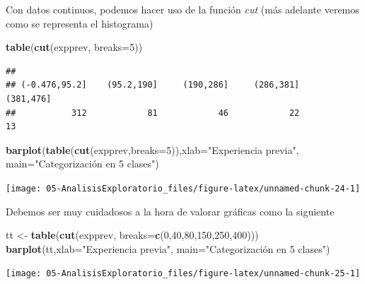 \documentclass[]{book}
\newenvironment{Shaded}{\begin{snugshade}}{\end{snugshade}}
\newcommand{\KeywordTok}[1]{\textcolor[rgb]{0.13,0.29,0.53}{\textbf{#1}}}
\newcommand{\DataTypeTok}[1]{\textcolor[rgb]{0.13,0.29,0.53}{#1}}
\newcommand{\DecValTok}[1]{\textcolor[rgb]{0.00,0.00,0.81}{#1}}
\newcommand{\StringTok}[1]{\textcolor[rgb]{0.31,0.60,0.02}{#1}}
\newcommand{\NormalTok}[1]{#1}
\begin{document}
Con datos continuos, podemos hacer uso de la función \emph{cut} (más
adelante veremos como se representa el histograma)

\begin{Shaded}
\begin{Highlighting}[]
\KeywordTok{table}\NormalTok{(}\KeywordTok{cut}\NormalTok{(expprev, }\DataTypeTok{breaks=}\DecValTok{5}\NormalTok{))}
\end{Highlighting}
\end{Shaded}

\begin{verbatim}
## 
## (-0.476,95.2]    (95.2,190]     (190,286]     (286,381]     (381,476] 
##           312            81            46            22            13
\end{verbatim}

\begin{Shaded}
\begin{Highlighting}[]
\KeywordTok{barplot}\NormalTok{(}\KeywordTok{table}\NormalTok{(}\KeywordTok{cut}\NormalTok{(expprev,}\DataTypeTok{breaks=}\DecValTok{5}\NormalTok{)),}\DataTypeTok{xlab=}\StringTok{"Experiencia previa"}\NormalTok{,}
        \DataTypeTok{main=}\StringTok{"Categorización en 5 clases"}\NormalTok{)}
\end{Highlighting}
\end{Shaded}

\begin{center}\texttt{[image: 05-AnalisisExploratorio\_files/figure-latex/unnamed-chunk-24-1]} \end{center}

Debemos ser muy cuidadosos a la hora de valorar gráficas como la
siguiente

\begin{Shaded}
\begin{Highlighting}[]
\NormalTok{tt <-}\StringTok{ }\KeywordTok{table}\NormalTok{(}\KeywordTok{cut}\NormalTok{(expprev, }\DataTypeTok{breaks=}\KeywordTok{c}\NormalTok{(}\DecValTok{0}\NormalTok{,}\DecValTok{40}\NormalTok{,}\DecValTok{80}\NormalTok{,}\DecValTok{150}\NormalTok{,}\DecValTok{250}\NormalTok{,}\DecValTok{400}\NormalTok{)))}
\KeywordTok{barplot}\NormalTok{(tt,}\DataTypeTok{xlab=}\StringTok{"Experiencia previa"}\NormalTok{, }\DataTypeTok{main=}\StringTok{"Categorización en 5 clases"}\NormalTok{)}
\end{Highlighting}
\end{Shaded}

\begin{center}\texttt{[image: 05-AnalisisExploratorio\_files/figure-latex/unnamed-chunk-25-1]} \end{center}
\end{document}

